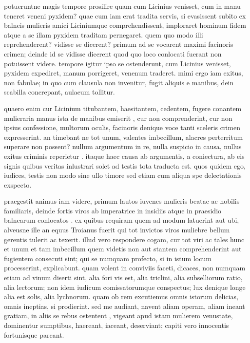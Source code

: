  potueruntne magis tempore prosilire quam cum Licinius venisset, cum in manu teneret veneni pyxidem? quae cum iam erat tradita servis, si evasissent subito ex balneis mulieris amici Liciniumque comprehendissent, imploraret hominum fidem atque a se illam pyxidem traditam pernegaret. quem quo modo illi reprehenderent? vidisse se dicerent? primum ad se vocarent maximi facinoris crimen; deinde id se vidisse dicerent quod quo loco conlocati fuerant non potuissent videre. tempore igitur ipso se ostenderunt, cum Licinius venisset, pyxidem expediret, manum porrigeret, venenum traderet. mimi ergo iam exitus, non fabulae; in quo cum clausula non invenitur, fugit aliquis e manibus, dein scabilla concrepant, aulaeum tollitur.

 quaero enim cur Licinium titubantem, haesitantem, cedentem, fugere conantem mulieraria manus ista de manibus emiserit , cur non comprenderint, cur non ipsius confessione, multorum oculis, facinoris denique voce tanti sceleris crimen expresserint. an timebant ne tot unum, valentes imbecillum, alacres perterritum superare non possent? nullum argumentum in re, nulla suspicio in causa, nullus exitus criminis reperietur . itaque haec causa ab argumentis, a coniectura, ab eis signis quibus veritas inlustrari solet ad testis tota traducta est. quos quidem ego, iudices, testis non modo sine ullo timore sed etiam cum aliqua spe delectationis exspecto.

 praegestit animus iam videre, primum lautos iuvenes mulieris beatae ac nobilis familiaris, deinde fortis viros ab imperatrice in insidiis atque in praesidio balnearum conlocatos . ex quibus requiram quem ad modum latuerint aut ubi, alveusne ille an equus Troianus fuerit qui tot invictos viros muliebre bellum gerentis tulerit ac texerit. illud vero respondere cogam, cur tot viri ac tales hunc et unum et tam imbecillum quem videtis non aut stantem comprehenderint aut fugientem consecuti sint; qui se numquam profecto, si in istum locum processerint, explicabunt. quam volent in conviviis faceti, dicaces, non numquam etiam ad vinum diserti sint, alia fori vis est, alia triclini, alia subselliorum ratio, alia lectorum; non idem iudicum comissatorumque conspectus; lux denique longe alia est solis, alia lychnorum. quam ob rem excutiemus omnis istorum delicias, omnis ineptias, si prodierint. sed me audiant, navent aliam operam, aliam ineant gratiam, in aliis se rebus ostentent , vigeant apud istam mulierem venustate, dominentur sumptibus, haereant, iaceant, deserviant; capiti vero innocentis fortunisque parcant.

